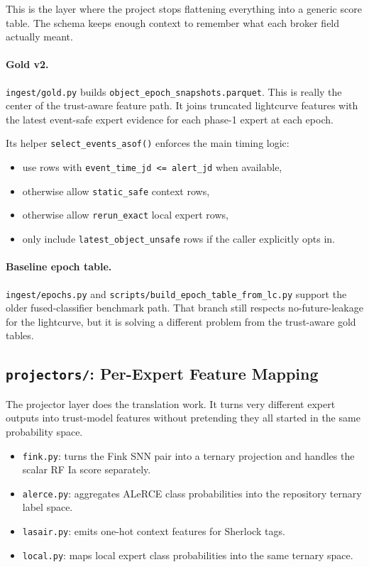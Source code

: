 \documentclass[11pt]{article}
\newcommand{\code}[1]{\texttt{#1}}
\begin{document}
This is the layer where the project stops flattening everything into a generic score table. The schema keeps enough context to remember what each broker field actually meant.

\paragraph{Gold v2.}
\code{ingest/gold.py} builds \code{object\_epoch\_snapshots.parquet}. This is really the center of the trust-aware feature path. It joins truncated lightcurve features with the latest event-safe expert evidence for each phase-1 expert at each epoch.

Its helper \code{select\_events\_asof()} enforces the main timing logic:

\begin{itemize}
\item use rows with \code{event\_time\_jd <= alert\_jd} when available,
\item otherwise allow \code{static\_safe} context rows,
\item otherwise allow \code{rerun\_exact} local expert rows,
\item only include \code{latest\_object\_unsafe} rows if the caller explicitly opts in.
\end{itemize}

\paragraph{Baseline epoch table.}
\code{ingest/epochs.py} and \code{scripts/build\_epoch\_table\_from\_lc.py} support the older fused-classifier benchmark path. That branch still respects no-future-leakage for the lightcurve, but it is solving a different problem from the trust-aware gold tables.

\subsection{\code{projectors/}: Per-Expert Feature Mapping}

The projector layer does the translation work. It turns very different expert outputs into trust-model features without pretending they all started in the same probability space.

\begin{itemize}
\item \code{fink.py}: turns the Fink SNN pair into a ternary projection and handles the scalar RF Ia score separately.
\item \code{alerce.py}: aggregates ALeRCE class probabilities into the repository ternary label space.
\item \code{lasair.py}: emits one-hot context features for Sherlock tags.
\item \code{local.py}: maps local expert class probabilities into the same ternary space.
\end{itemize}
\end{document}
